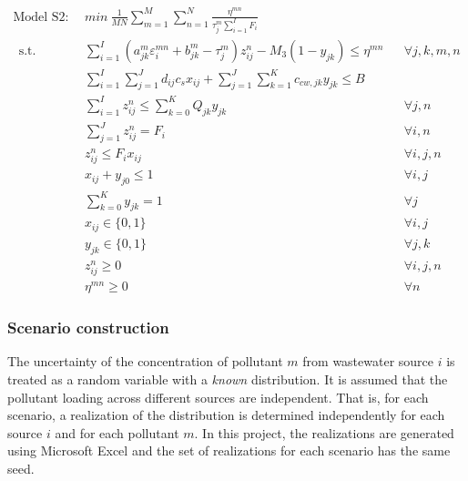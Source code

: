 \documentclass[preprint,12pt,authoryear]{elsarticle}
\begin{document}
\setcounter{equation}{0}
\begin{align}%
	\text{Model S2}:~~&min ~ \frac{1}{MN}\sum_{m=1}^M\sum_{n=1}^N \frac{\eta^{mn}}{\tau_j^m \sum_{i=1}^I F_i} \nonumber\\~~
	\mbox{s.t.}~~
	&\sum_{i=1}^I (a_{jk}^m \varepsilon_i^{mn} + b_{jk}^m - \tau_j^m) z_{ij}^n - M_3 (1 - y_{jk})\leq \eta^{mn} && \forall j,k,m,n \label{constraint:treatments2}\\	
	&\sum_{i=1}^{I}\sum_{j=1}^{J}d_{ij}c_s x_{ij} + \sum_{j=1}^{J}\sum_{k=1}^{K}c_{cw,jk}y_{jk} \leq B && \\
 	&\sum_{i=1}^{I} z_{ij}^n \leq \sum_{k=0}^K Q_{jk} y_{jk} && \forall j,n\\
	&\sum_{j=1}^J z_{ij}^n = F_i && \forall i,n\\
	&z_{ij}^n \leq F_i x_{ij} && \forall i,j,n\\
	&x_{ij} + y_{j0} \leq 1 && \forall i,j\\
	&\sum_{k=0}^{K}y_{jk} = 1&&\forall j\\
	&x_{ij} \in \{0,1\}&&\forall i,j\\
	&y_{jk} \in \{0,1\}&&\forall j,k\\
	&z_{ij}^n \geq 0&&\forall i,j,n\\ 
	&\eta^{mn} \geq 0&&\forall n
\end{align}
\renewcommand{\theequation}{\thesection--\arabic{equation}}

\subsubsection{Scenario construction}\label{scengen}
The uncertainty of the concentration of pollutant $m$ from wastewater source $i$ is treated as a random variable with a \emph{known} distribution. It is assumed that the pollutant loading across different sources are independent. That is, for each scenario, a realization of the distribution is determined independently for each source $i$ and for each pollutant $m$. In this project, the realizations are generated using Microsoft Excel and the set of realizations for each scenario has the same seed.  
\end{document}
